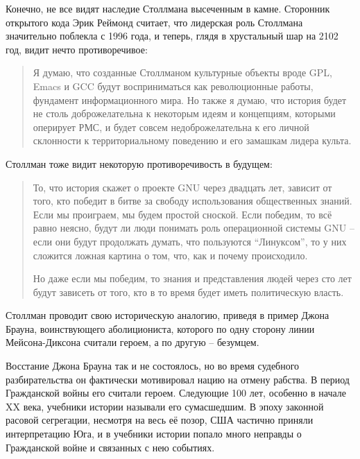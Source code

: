 Конечно, не все видят наследие Столлмана высеченным в камне. Сторонник открытого кода Эрик Реймонд считает, что лидерская роль Столлмана значительно поблекла с 1996 года, и теперь, глядя в хрустальный шар на 2102 год, видит нечто противоречивое:

\begin{quote}
Я думаю, что созданные Столлманом культурные объекты вроде GPL, Emacs и GCC будут восприниматься как революционные работы, фундамент информационного мира. Но также я думаю, что история будет не столь доброжелательна к некоторым идеям и концепциям, которыми оперирует РМС, и будет совсем недоброжелательна к его личной склонности к территориальному поведению и его замашкам лидера культа.
\end{quote}

Столлман тоже видит некоторую противоречивость в будущем:

\begin{quote}
То, что история скажет о проекте GNU через двадцать лет, зависит от того, кто победит в битве за свободу использования общественных знаний. Если мы проиграем, мы будем простой сноской. Если победим, то всё равно неясно, будут ли люди понимать роль операционной системы GNU -- если они будут продолжать думать, что пользуются \enquote{Линуксом}, то у них сложится ложная картина о том, что, как и почему происходило.

Но даже если мы победим, то знания и представления людей через сто лет будут зависеть от того, кто в то время будет иметь политическую власть.
\end{quote}

Столлман проводит свою историческую аналогию, приведя в пример Джона Брауна, воинствующего аболициониста, которого по одну сторону линии Мейсона-Диксона считали героем, а по другую -- безумцем.

Восстание Джона Брауна так и не состоялось, но во время судебного разбирательства он фактически мотивировал нацию на отмену рабства. В период Гражданской войны его считали героем. Следующие 100 лет, особенно в начале XX века, учебники истории называли его сумасшедшим. В эпоху законной расовой сегрегации, несмотря на весь её позор, США частично приняли интерпретацию Юга, и в учебники истории попало много неправды о Гражданской войне и связанных с нею событиях.

